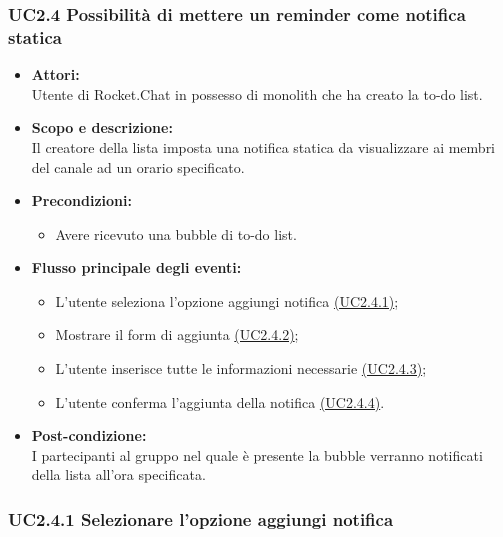 \subsubsection{UC2.4 Possibilità di mettere un reminder come notifica statica} \label{UC2.4}

\begin{itemize}
	\item \textbf{Attori:}
	\\Utente di Rocket.Chat in possesso di monolith che ha creato la to-do list.
	\item \textbf{Scopo e descrizione:} 
	\\Il creatore della lista imposta una notifica statica da visualizzare ai membri del canale ad un orario specificato.
	\item \textbf{Precondizioni:}
	\begin{itemize}
		\item Avere ricevuto una bubble di to-do list.
	\end{itemize}
	\item \textbf{Flusso principale degli eventi:}
	\begin{itemize}
		\item L’utente seleziona l’opzione aggiungi notifica \hyperref[UC2.4.1]{(UC2.4.1)};
		\item Mostrare il form di aggiunta \hyperref[UC2.4.2]{(UC2.4.2)};
		\item L’utente inserisce tutte le informazioni necessarie \hyperref[UC2.4.3]{(UC2.4.3)};
		\item L’utente conferma l’aggiunta della notifica \hyperref[UC2.4.4]{(UC2.4.4)}.
	\end{itemize}
	\item \textbf{Post-condizione:}
	\\I partecipanti al gruppo nel quale è presente la bubble verranno notificati della lista all'ora specificata.
\end{itemize}

\subsubsection{UC2.4.1 Selezionare l’opzione aggiungi notifica} \label{UC2.4.1}

